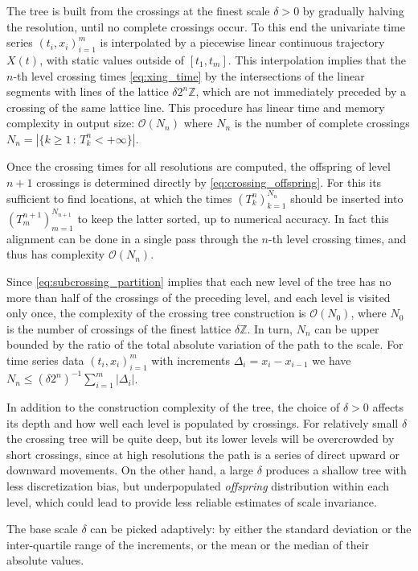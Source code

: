 \documentclass[a4paper]{article}
\begin{document}
The tree is built from the crossings at the finest scale $\delta > 0$ by gradually
halving the resolution, until no complete crossings occur. To this end the univariate
time series $(t_i, x_i)_{i=1}^m$ is interpolated by a piecewise linear continuous
trajectory $X(t)$, with static values outside of $[t_1, t_m]$. This interpolation
implies that the $n$-th level crossing times \eqref{eq:xing_time} by the intersections
of the linear segments with lines of the lattice $\delta 2^n \mathbb{Z}$, which
are not immediately preceded by a crossing of the same lattice line. This procedure
has linear time and memory complexity in output size: $\mathcal{O}(N_n)$ where $N_n$
is the number of complete crossings $N_n = |\{k\geq 1\,:\, T_k^n < +\infty\}|$.

Once the crossing times for all resolutions are computed, the offspring of level
$n+1$ crossings is determined directly by \eqref{eq:crossing_offspring}. For this
its sufficient to find locations, at which the times $(T_k^n)_{k=1}^{N_n}$ should
be inserted into $(T_m^{n+1})_{m=1}^{N_{n+1}}$ to keep the latter sorted, up to
numerical accuracy. In fact this alignment can be done in a single pass through
the $n$-th level crossing times, and thus has complexity $\mathcal{O}(N_n)$.

Since \eqref{eq:subcrossing_partition} implies that each new level of the tree has
no more than half of the crossings of the preceding level, and each level is visited
only once, the complexity of the crossing tree construction is $\mathcal{O}(N_0)$,
where $N_0$ is the number of crossings of the finest lattice $\delta \mathbb{Z}$.
In turn, $N_n$ can be upper bounded by the ratio of the total absolute variation
of the path to the scale. For time series data $(t_i, x_i)_{i=1}^m$ with increments
$\Delta_i = x_i - x_{i-1}$ we have $N_n \leq (\delta 2^n)^{-1} \sum_{i=1}^m |\Delta_i|$.

In addition to the construction complexity of the tree, the choice of $\delta > 0$
affects its depth and how well each level is populated by crossings. For relatively
small $\delta$ the crossing tree will be quite deep, but its lower levels will be
overcrowded by short crossings, since at high resolutions the path is a series of
direct upward or downward movements. On the other hand, a large $\delta$ produces
a shallow tree with less discretization bias, but underpopulated \emph{offspring}
distribution within each level, which could lead to provide less reliable estimates
of scale invariance.

The base scale $\delta$ can be picked adaptively: by either the standard deviation
or the inter-quartile range of the increments, or the mean or the median of their
absolute values.
\end{document}
